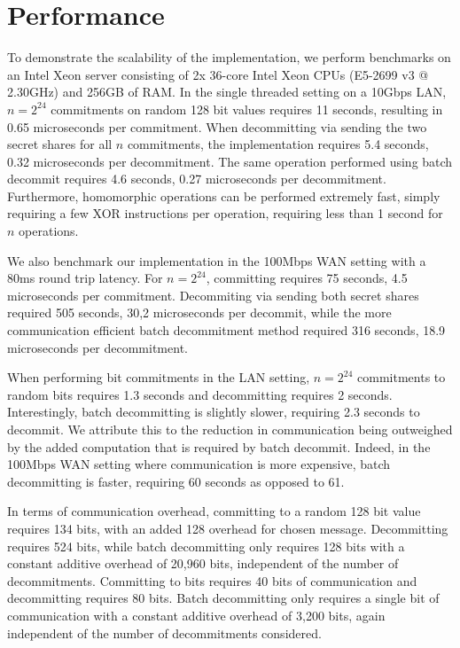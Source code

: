 
\section{Performance}
To demonstrate the scalability of the implementation, we perform benchmarks on an Intel Xeon server consisting of 2x 36-core Intel Xeon CPUs (E5-2699 v3 @ 2.30GHz) and 256GB of RAM. In the single threaded setting on a 10Gbps LAN, $n=2^{24}$ commitments on random 128 bit values requires 11 seconds, resulting in 0.65 microseconds per commitment. When decommitting via sending the two secret shares for all $n$ commitments, the implementation requires 5.4 seconds, 0.32 microseconds per decommitment. The same operation performed using batch decommit requires 4.6 seconds, 0.27 microseconds per decommitment. Furthermore, homomorphic operations can be performed extremely fast, simply requiring  a few XOR instructions per operation, requiring less than 1 second for $n$ operations.

We also benchmark our implementation in the 100Mbps WAN setting with a 80ms round trip latency. For $n=2^{24}$, committing  requires 75 seconds, 4.5 microseconds per commitment. Decommiting via sending both secret shares required 505 seconds, 30,2 microseconds per decommit, while the more communication efficient batch decommitment method required 316 seconds, 18.9 microseconds per decommitment.

When performing bit commitments in the LAN setting, $n=2^{24}$ commitments to random bits requires 1.3 seconds and decommitting requires 2 seconds. Interestingly, batch decommitting is slightly slower, requiring 2.3 seconds to decommit. We attribute this to the reduction in communication being outweighed by the added computation that is required by batch decommit. Indeed, in the 100Mbps WAN setting where communication is more expensive, batch decommitting is faster, requiring 60 seconds as opposed to 61.

In terms of communication overhead, committing to a random 128 bit value requires 134 bits, with an added 128 overhead for chosen message. Decommitting requires 524 bits, while batch decommitting only requires 128 bits with a constant additive overhead of 20,960 bits, independent of the number of decommitments. Committing to bits requires 40 bits of communication and decommitting requires 80 bits. Batch decommitting only requires a single bit of communication with a constant additive overhead of 3,200 bits, again independent of the number of decommitments considered.
